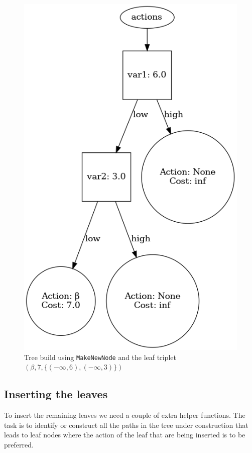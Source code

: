 \documentclass{article}
\begin{document}
\begin{figure}[ht]
    \centering
    \includegraphics[scale=0.4]{exampleRoot}
    \caption{%
        Tree build using \texttt{MakeNewNode} and the leaf triplet $(\beta, 7,
        \{ (-\infty, 6), (-\infty, 3) \})$ 
    }\label{fig:rootTree}
\end{figure}

\subsection{Inserting the leaves}

To insert the remaining leaves we need a couple of extra helper functions. The
task is to identify or construct all the paths in the tree under construction
that leads to leaf nodes where the action of the leaf that are being inserted is
to be preferred.
\end{document}
